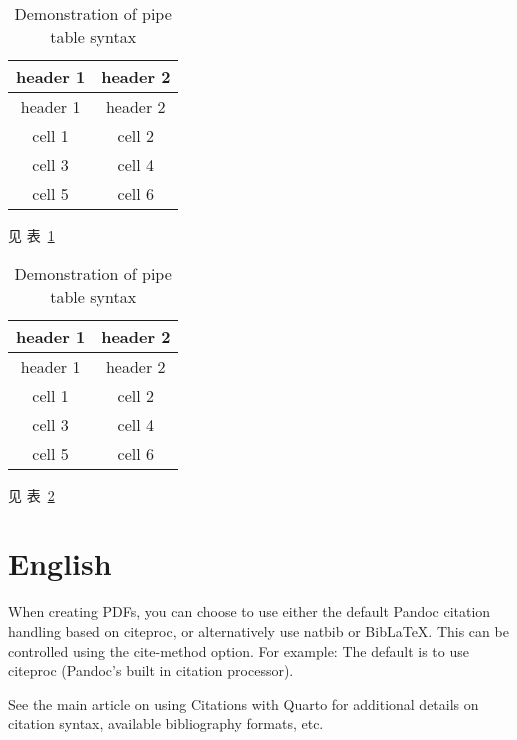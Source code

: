 \documentclass[
  a4paper,
]{article}
\begin{document}
\hypertarget{tbl-1}{}
\begin{longtable}[]{@{}cc@{}}
\caption{\label{tbl-1}Demonstration of pipe table syntax}\tabularnewline
\toprule()
header 1 & header 2 \\
\midrule()
\endfirsthead
\toprule()
header 1 & header 2 \\
\midrule()
\endhead
cell 1 & cell 2 \\
cell 3 & cell 4 \\
cell 5 & cell 6 \\
\bottomrule()
\end{longtable}

见 表~\ref{tbl-1}

\hypertarget{tbl-2}{}
\begin{longtable}[]{@{}cc@{}}
\caption{\label{tbl-2}Demonstration of pipe table syntax}\tabularnewline
\toprule()
header 1 & header 2 \\
\midrule()
\endfirsthead
\toprule()
header 1 & header 2 \\
\midrule()
\endhead
cell 1 & cell 2 \\
cell 3 & cell 4 \\
cell 5 & cell 6 \\
\bottomrule()
\end{longtable}

见 表~\ref{tbl-2}

\hypertarget{english}{%
\section{English}\label{english}}

When creating PDFs, you can choose to use either the default Pandoc
citation handling based on citeproc, or alternatively use natbib or
BibLaTeX. This can be controlled using the cite-method option. For
example: The default is to use citeproc (Pandoc's built in citation
processor).

See the main article on using Citations with Quarto for additional
details on citation syntax, available bibliography formats, etc.


\printbibliography[title=References]
\end{document}
